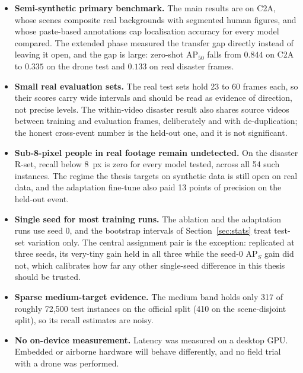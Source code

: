\begin{itemize}
  \item \textbf{Semi-synthetic primary benchmark.} The main results are on
        C2A, whose scenes composite real backgrounds with segmented human
        figures, and whose paste-based annotations cap localisation accuracy
        for every model compared. The extended phase measured the transfer
        gap directly instead of leaving it open, and the gap is large:
        zero-shot $\mathrm{AP}_{50}$ falls from $0.844$ on C2A to $0.335$ on
        the drone test and $0.133$ on real disaster frames.
  \item \textbf{Small real evaluation sets.} The real test sets hold 23 to
        60 frames each, so their scores carry wide intervals and should be
        read as evidence of direction, not precise levels. The within-video
        disaster result also shares source videos between training and
        evaluation frames, deliberately and with de-duplication; the honest
        cross-event number is the held-out one, and it is not significant.
  \item \textbf{Sub-8-pixel people in real footage remain undetected.} On
        the disaster R-set, recall below 8~px is zero for every model
        tested, across all 54 such instances. The regime the thesis targets
        on synthetic data is still open on real data, and the adaptation
        fine-tune also paid 13 points of precision on the held-out event.
  \item \textbf{Single seed for most training runs.} The ablation and the
        adaptation runs use seed 0, and the bootstrap intervals of
        Section~\ref{sec:stats} treat test-set variation only. The central
        assignment pair is the exception: replicated at three seeds, its
        very-tiny gain held in all three while the seed-0 $\mathrm{AP}_S$
        gain did not, which calibrates how far any other single-seed
        difference in this thesis should be trusted.
  \item \textbf{Sparse medium-target evidence.} The medium band holds only
        317 of roughly 72{,}500 test instances on the official split (410 on
        the scene-disjoint split), so its recall estimates are noisy.
  \item \textbf{No on-device measurement.} Latency was measured on a desktop
        GPU. Embedded or airborne hardware will behave differently, and no
        field trial with a drone was performed.
\end{itemize}

